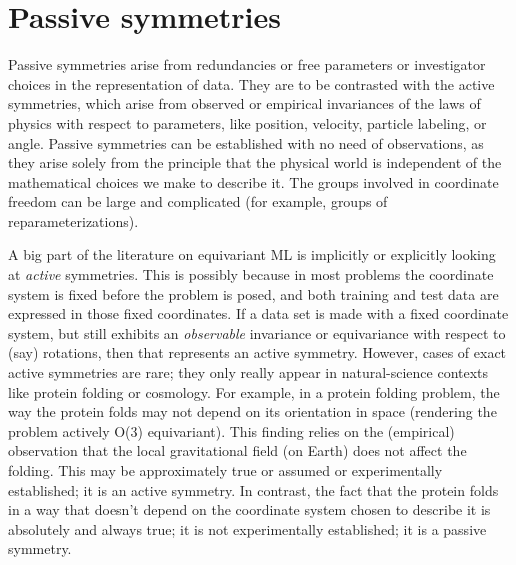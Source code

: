\documentclass{article}
\theoremstyle{plain}
\theoremstyle{definition}
\theoremstyle{remark}
\begin{document}
\section{Passive symmetries}\label{sec:informal}

Passive symmetries arise from redundancies or free parameters or investigator choices in the representation of data.
They are to be contrasted with the active symmetries, which arise from observed or empirical invariances of the laws of physics with respect to parameters, like position, velocity, particle labeling, or angle.
Passive symmetries can be established with no need of observations, as they arise solely from the principle that the physical world is independent of the mathematical choices we make to describe it.
The groups involved in coordinate freedom can be large and complicated (for example, groups of reparameterizations).

A big part of the literature on equivariant ML is implicitly or explicitly looking at \emph{active} symmetries.
This is possibly because in most problems the coordinate system is fixed before the problem is posed, and both training and test data are expressed in those fixed coordinates.
If a data set is made with a fixed coordinate system, but still exhibits an {\em observable} invariance or equivariance with respect to (say) rotations, then that represents an active symmetry.
However, cases of exact active symmetries are rare; they only really appear in natural-science contexts like protein folding or cosmology.
For example, in a protein folding problem, the way the protein folds may not depend on its orientation in space (rendering the problem actively O(3) equivariant).
This finding relies on the (empirical) observation that the local gravitational field (on Earth) does not affect the folding.
This may be approximately true or assumed or experimentally established; it is an active symmetry.
In contrast, the fact that the protein folds in a way that doesn't depend on the coordinate system chosen to describe it is absolutely and always true; it is not experimentally established; it is a passive symmetry.
\end{document}
